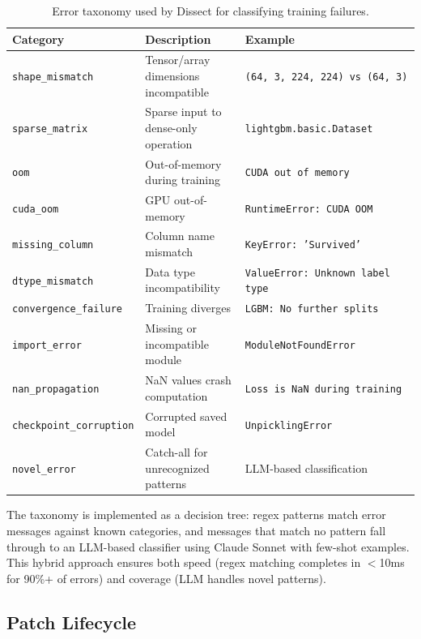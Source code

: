 \documentclass[conference]{IEEEtran}
\begin{document}
\begin{table}[ht]
  \centering
  \small
  \caption{Error taxonomy used by Dissect for classifying training failures.}
  \label{tab:taxonomy}
  \begin{tabular}{p{}p{}p{}}
  \toprule
  \textbf{Category} & \textbf{Description} & \textbf{Example} \\
  \midrule
  \texttt{shape\_mismatch} & Tensor/array dimensions incompatible &
  \texttt{(64,~3,~224,~224)~vs~(64,~3)} \\
  \texttt{sparse\_matrix} & Sparse input to dense-only operation &
  \texttt{lightgbm.basic.Dataset} \\
  \texttt{oom} & Out-of-memory during training &
  \texttt{CUDA out of memory} \\
  \texttt{cuda\_oom} & GPU out-of-memory &
  \texttt{RuntimeError: CUDA OOM} \\
  \texttt{missing\_column} & Column name mismatch &
  \texttt{KeyError: 'Survived'} \\
  \texttt{dtype\_mismatch} & Data type incompatibility &
  \texttt{ValueError: Unknown label type} \\
  \texttt{convergence\_failure} & Training diverges &
  \texttt{LGBM: No further splits} \\
  \texttt{import\_error} & Missing or incompatible module &
  \texttt{ModuleNotFoundError} \\
  \texttt{nan\_propagation} & NaN values crash computation &
  \texttt{Loss is NaN during training} \\
  \texttt{checkpoint\_corruption} & Corrupted saved model &
  \texttt{UnpicklingError} \\
  \texttt{novel\_error} & Catch-all for unrecognized patterns &
  LLM-based classification \\
  \bottomrule
  \end{tabular}
\end{table}

The taxonomy is implemented as a decision tree: regex patterns match error messages
against known categories, and messages that match no pattern fall through to an LLM-based
classifier using Claude Sonnet with few-shot examples. This hybrid approach ensures both
speed (regex matching completes in $<$10ms for 90\%+ of errors) and coverage (LLM handles
novel patterns).

\subsection{Patch Lifecycle}
\end{document}
